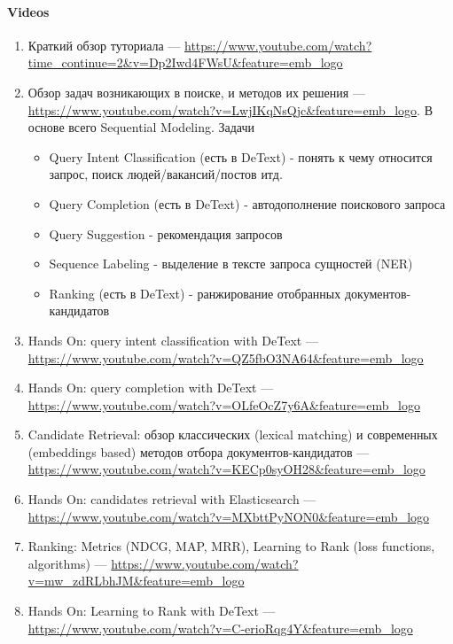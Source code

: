 \paragraph{Videos}

\begin{enumerate}
    \item Краткий обзор туториала --- \url{https://www.youtube.com/watch?time_continue=2&v=Dp2Iwd4FWsU&feature=emb_logo}
    \item Обзор задач возникающих в поиске, и методов их решения --- \url{https://www.youtube.com/watch?v=LwjIKqNsQjc&feature=emb_logo}. В основе всего Sequential Modeling. 
    Задачи
        \begin{itemize}
            \item Query Intent Classification (есть в DeText) - понять к чему относится запрос, поиск людей/вакансий/постов итд.
            \item Query Completion (есть в DeText) - автодополнение поискового запроса
            \item Query Suggestion - рекомендация запросов
            \item Sequence Labeling - выделение в тексте запроса сущностей (NER)
            \item Ranking (есть в DeText) - ранжирование отобранных документов-кандидатов
        \end{itemize}
    \item Hands On: query intent classification with DeText --- \url{https://www.youtube.com/watch?v=QZ5fbO3NA64&feature=emb_logo}
    \item Hands On: query completion with DeText --- \url{https://www.youtube.com/watch?v=OLfeOcZ7y6A&feature=emb_logo}
    \item Candidate Retrieval: обзор классических (lexical matching) и современных (embeddings based) методов отбора документов-кандидатов --- \url{https://www.youtube.com/watch?v=KECp0syOH28&feature=emb_logo}
    \item Hands On: candidates retrieval with Elasticsearch --- \url{https://www.youtube.com/watch?v=MXbttPyNON0&feature=emb_logo}
    \item Ranking: Metrics (NDCG, MAP, MRR), Learning to Rank (loss functions, algorithms) --- \url{https://www.youtube.com/watch?v=mw_zdRLbhJM&feature=emb_logo}
    \item Hands On: Learning to Rank with DeText --- \url{https://www.youtube.com/watch?v=C-erioRqg4Y&feature=emb_logo}
\end{enumerate}

